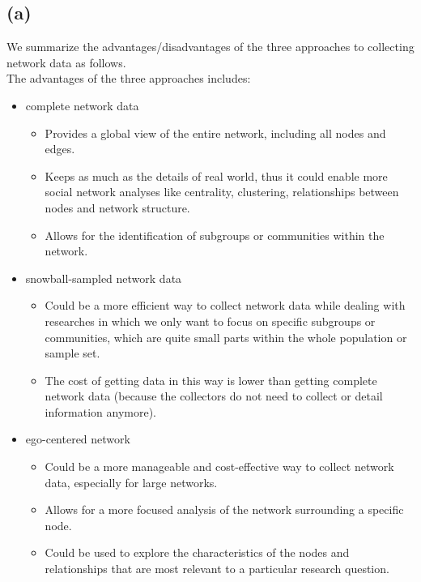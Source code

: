\documentclass[11pt]{article}
\begin{document}
\subsection*{(a)}
    \par We summarize the advantages/disadvantages of the three approaches to collecting network data as follows.
    \\ The advantages of the three approaches includes:
    \begin{itemize}
        \item complete network data
            \begin{itemize}
                \item Provides a global view of the entire network, including all nodes and edges.
                \item Keeps as much as the details of real world, thus it could enable more social network analyses like centrality, clustering, relationships between nodes and network structure.
                \item Allows for the identification of subgroups or communities within the network.
            \end{itemize}
        \item snowball-sampled network data
            \begin{itemize}
                \item Could be a more efficient way to collect network data while dealing with researches in which we only want to focus on specific subgroups or communities, which are quite small parts within the whole population or sample set.
                \item The cost of getting data in this way is lower than getting complete network data (because the collectors do not need to collect or detail information anymore).
            \end{itemize}
        \item ego-centered network
            \begin{itemize}
                \item Could be a more manageable and cost-effective way to collect network data, especially for large networks.
                \item Allows for a more focused analysis of the network surrounding a specific node.
                \item Could be used to explore the characteristics of the nodes and relationships that are most relevant to a particular research question.
            \end{itemize}
    \end{itemize}
    
\end{document}

